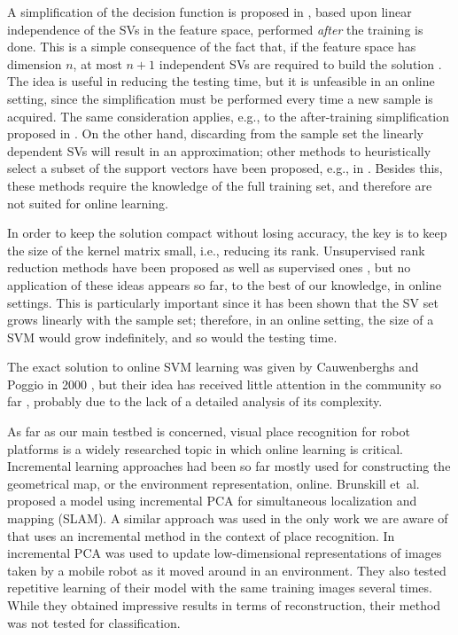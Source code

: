 A simplification of the decision function is proposed in
\cite{DownsGM01}, based upon linear independence of the SVs in the
feature space, performed \emph{after} the training is done. This is a
simple consequence of the fact that, if the feature space has
dimension $n$, at most $n+1$ independent SVs are required to build the
solution \cite{PontilV98}. The idea is useful in reducing the testing
time, but it is unfeasible in an online setting, since the
simplification must be performed every time a new sample is
acquired. The same consideration applies, e.g., to the after-training
simplification proposed in \cite{nguyen2005}. On the other hand,
discarding from the sample set the linearly dependent SVs will result
in an approximation; other methods to heuristically select a subset of
the support vectors have been proposed, e.g., in
\cite{LeeM01,schoel06,KeerthiCDC06}. Besides this, these methods
require the knowledge of the full training set, and therefore are not
suited for online learning.

In order to keep the solution compact without losing accuracy, the key
is to keep the size of the kernel matrix small, i.e., reducing its
rank. Unsupervised rank reduction methods have been proposed
\cite{Baudat03} as well as supervised ones \cite{BachJordan2005}, but
no application of these ideas appears so far, to the best of our
knowledge, in online settings. This is particularly important since it
has been shown \cite{Steinwart03} that the SV set grows linearly with
the sample set; therefore, in an online setting, the size of a SVM
would grow indefinitely, and so would the testing time.

The exact solution to online SVM learning was given by Cauwenberghs
and Poggio in 2000 \cite{CauwenberghsP00}, but their idea has received
little attention in the community so far \cite{Laskov2006}, probably
due to the lack of a detailed analysis of its complexity.

As far as our main testbed is concerned, visual place recognition for
robot platforms is a widely researched topic in which online learning
is critical. Incremental learning approaches had been so far mostly
used for constructing the geometrical map, or the environment
representation, online.  Brunskill et~al. \cite{emma:irca05} proposed
a model using incremental PCA for simultaneous localization and
mapping (SLAM). A similar approach was used in the only work we are
aware of that uses an incremental method in the context of place
recognition. In \cite{ljubjiana:icra02} incremental PCA was used to
update low-dimensional representations of images taken by a mobile
robot as it moved around in an environment. They also tested
repetitive learning of their model with the same training images
several times. While they obtained impressive results in terms of
reconstruction, their method was not tested for classification.
